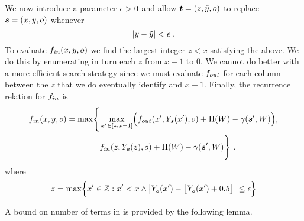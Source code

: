 We now introduce a parameter $\RoundoffEps>0$ and allow
$\OtherState=(z,\tilde{y},\WallOrient)$ to replace
$\State=(x,y,\WallOrient)$ whenever
\begin{equation}
  |y-\tilde{y}| < \RoundoffEps ~.
  \label{eq:eps}
\end{equation}
To evaluate $\SubProbIN(x,y,\WallOrient)$ we find the largest integer
$z<x$ satisfying the above. We do this by enumerating in turn each $z$
from $x-1$ to $0$. We cannot do better with a more efficient search
strategy since we must evaluate $\SubProbOUT$ for each column between
the $z$ that we do eventually identify and $x-1$. Finally, the
recurrence relation for $\SubProbIN$ is
\begin{equation}
  \label{eq:fin-recurrence-final}
  \begin{split}
    \SubProbIN(x,y,\WallOrient) = 
    \max \Biggl\{&
      \max_{x'\in[z,x-1]}\limits \Bigl(
        \SubProbOUT(x',Y_{\State}(x'),\WallOrient) 
        + \ScenePayoff(\Wall) 
        - \CornerPenalty(\State', \Wall)
      \Bigr),\\
      & \SubProbIN(z, Y_{\State}(z), \WallOrient)
      + \ScenePayoff(\Wall) 
      - \CornerPenalty(\State', \Wall)
    \Biggr\} ~.
  \end{split}
\end{equation}
where
\begin{equation}
  z = \max \Bigl\{x'\in\Ints : x'<x \wedge
    \bigl|Y_{\State}(x') - \bigl\lfloor Y_{\State}(x') + 0.5 \bigr\rfloor\bigr|
    \leq \RoundoffEps \Bigr\}
\end{equation}

A bound on number of terms in  is
provided by the following lemma.

